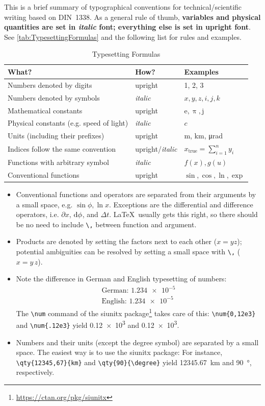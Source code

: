 \documentclass[11pt, twoside=false, usegeometry=true, parskip=half, toc=listof, numbers=noendperiod]{scrreprt}
\begin{document}
This is a brief summary of typographical conventions for technical/scientific writing based on DIN~1338. As a general rule of thumb, \textbf{variables and physical quantities are set in \textit{italic} font; everything else is set in upright font}. See \autoref{tab:TypesettingFormulas} and the following list for rules and examples.
\begin{table}[htbp]
	\centering
	\caption{Typesetting Formulas}
	\label{tab:TypesettingFormulas}
	\begin{tabular}{lll}
		\toprule
			\textbf{What?}	&	\textbf{How?}	&	\textbf{Examples}	\\
		\midrule
			Numbers denoted by digits	&	upright	&	1, 2, 3	\\
			Numbers denoted by symbols	&	\textit{italic}	&	$x, y, z, i, j, k$	\\
			Mathematical constants	&	upright	&	$\mathrm{e}, \uppi, \mathrm{j}$	\\
			Physical constants (e.g. speed of light)	&	\textit{italic}	&	$c$	\\
			Units (including their prefixes)	&	upright	&	m, km, \si{\micro\radian}	\\
			Indices follow the same convention	&	upright/\textit{italic}	&	$x_{\mathrm{true}} = \sum_{i=1}^n y_i$	\\
			Functions with arbitrary symbol	&	\textit{italic}	&	$f(x), g(u)$	\\
			Conventional functions	&	upright	&	$\sin, \cos, \ln, \exp$	\\
		\bottomrule
	\end{tabular}
\end{table}

\begin{itemize}
	\item Conventional functions and operators are separated from their arguments by a small space, e.g. $\sin\phi, \ln x$. Exceptions are the differential and difference operators, i.e. $\partial x$, $\mathrm{d}\phi$, and $\Delta t$. \LaTeX\ usually gets this right, so there should be no need to include \verb|\,| between function and argument.
	\item	Products are denoted by setting the factors next to each other ($x = yz$); potential ambiguities can be resolved by setting a small space with \verb|\,| ($x = y\,z$).
	\item Note the difference in German and English typesetting of numbers:
		\begin{gather*}
			\text{German: }	\num[locale = DE]{1,234e-5}	\\
			\text{English: }	\num[locale = US]{1,234e-5}
		\end{gather*}
		The \verb|\num| command of the \textsf{siunitx} package\footnote{\url{https://ctan.org/pkg/siunitx}} takes care of this: \verb|\num{0,12e3}| and \verb|\num{.12e3}| yield \num{0,12e3} and \num{.12e3}.
	\item Numbers and their units (except the degree symbol) are separated by a small space. The easiest way is to use the \textsf{siunitx} package: For instance, \verb|\qty{12345,67}{km}| and \verb|\qty{90}{\degree}| yield \qty{12345,67}{km} and \qty{90}{\degree}, respectively.
\end{itemize}

\nocite{*}

\appendix

\printbibliography
\end{document}
